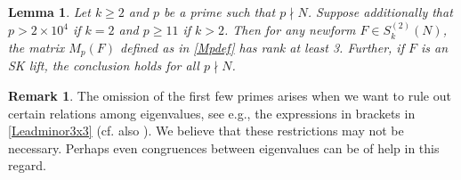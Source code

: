 \documentclass[11pt]{amsart}
\numberwithin{equation}{section}
\theoremstyle{plain}
\newtheorem{lem}[thm]{Lemma}
\theoremstyle{definition}
\newtheorem{rmk}[thm]{Remark}
\begin{document}
\begin{lem}\label{Mprankge3}
Let $k \ge 2$ and $p$ be a prime such that $p\nmid N$. Suppose additionally that $p>2\times 10^4$ if $k=2$ and $p\ge 11$ if $k>2$. Then for any newform $F\in S_k^{(2)}(N)$, the matrix $M_p(F)$ defined as in \eqref{Mpdef} has rank at least 3. Further, if $F$ is an SK lift, the conclusion holds for all $p\nmid N$.
\end{lem}

\begin{rmk} \label{p17}
    The omission of the first few primes arises when we want to rule out certain relations among eigenvalues, see e.g., the expressions in brackets in \eqref{Leadminor3x3} (cf. also \cite[Theorem 4.1]{farmer2013survey}). We believe that these restrictions may not be necessary. Perhaps even congruences between eigenvalues can be of help in this regard. 
\end{rmk}
\end{document}
